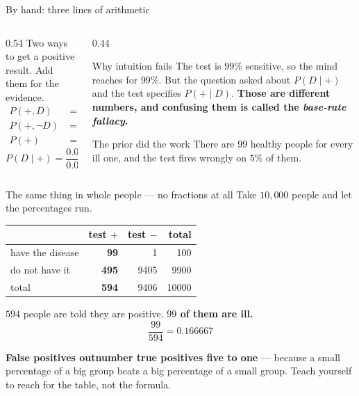 \documentclass[aspectratio=169]{beamer}
\begin{document}
\begin{frame}[shrink=6]{By hand: three lines of arithmetic}
  \begin{columns}[T]
    \begin{column}{0.54\textwidth}
      Two ways to get a positive result. Add them for the evidence.
      \begin{align*}
        P(+, D)      &= 0.99 \times 0.01 = 0.009900\\
        P(+, \lnot D) &= 0.05 \times 0.99 = 0.049500\\[0.2em]
        P(+)         &= 0.009900 + 0.049500 = 0.059400
      \end{align*}
      \[
        P(D \mid +) = \frac{0.009900}{0.059400}
                    = \frac{99}{594} = \frac{1}{6} = 0.166667
      \]
    \end{column}
    \begin{column}{0.44\textwidth}
      \begin{alertblock}{Why intuition fails}
        \small The test is $99\%$ sensitive, so the mind reaches for
        $99\%$. But the question asked about $P(D \mid +)$ and the test
        specifies $P(+ \mid D)$. \textbf{Those are different numbers, and
        confusing them is called the \emph{base-rate fallacy}.}
      \end{alertblock}
      \begin{block}{The prior did the work}
        \small There are $99$ healthy people for every ill one, and the test
        fires wrongly on $5\%$ of them.
      \end{block}
    \end{column}
  \end{columns}
\end{frame}

\begin{frame}[shrink=6]{The same thing in whole people --- no fractions at all}
  Take $10{,}000$ people and let the percentages run.
  \begin{center}\small
  \begin{tabular}{@{}lrrr@{}}
    \toprule
     & \textbf{test $+$} & \textbf{test $-$} & \textbf{total}\\
    \midrule
    have the disease   & \textbf{99}  & 1    & 100\\
    do not have it     & \textbf{495} & 9405 & 9900\\
    \midrule
    total              & \textbf{594} & 9406 & 10000\\
    \bottomrule
  \end{tabular}
  \end{center}
  \begin{center}
    $594$ people are told they are positive. \textbf{$99$ of them are ill.}
    \[
      \frac{99}{594} = 0.166667
    \]
  \end{center}
  \begin{exampleblock}{}
    \centering\small
    \textbf{False positives outnumber true positives five to one} --- because
    a small percentage of a big group beats a big percentage of a small
    group. Teach yourself to reach for the table, not the formula.
  \end{exampleblock}
\end{frame}
\end{document}
